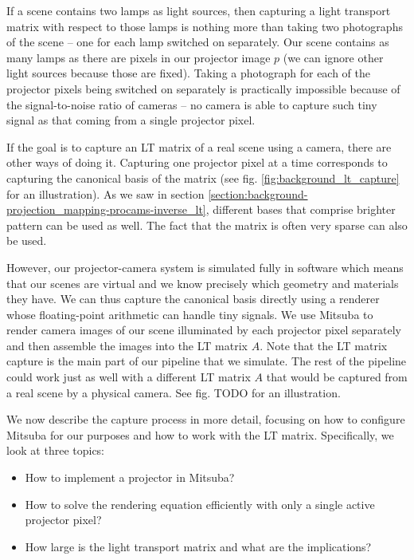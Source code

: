 If a scene contains two lamps as light sources, then capturing a light transport matrix with respect to those lamps is nothing more than taking two photographs of the scene -- one for each lamp switched on separately. Our scene contains as many lamps as there are pixels in our projector image \(p\) (we can ignore other light sources because those are fixed). Taking a photograph for each of the projector pixels being switched on separately is practically impossible because of the signal-to-noise ratio of cameras -- no camera is able to capture such tiny signal as that coming from a single projector pixel.

If the goal is to capture an LT matrix of a real scene using a camera, there are other ways of doing it. Capturing one projector pixel at a time corresponds to capturing the canonical basis of the matrix (see fig. \ref{fig:background_lt_capture} for an illustration). As we saw in section \ref{section:background-projection_mapping-procams-inverse_lt}, different bases that comprise brighter pattern can be used as well. The fact that the matrix is often very sparse can also be used.

However, our projector-camera system is simulated fully in software which means that our scenes are virtual and we know precisely which geometry and materials they have. We can thus capture the canonical basis directly using a renderer whose floating-point arithmetic can handle tiny signals. We use Mitsuba to render camera images of our scene illuminated by each projector pixel separately and then assemble the images into the LT matrix \(A\). Note that the LT matrix capture is the main part of our pipeline that we simulate. The rest of the pipeline could work just as well with a different LT matrix \(A\) that would be captured from a real scene by a physical camera. See fig. {\color{red} TODO} for an illustration.

We now describe the capture process in more detail, focusing on how to configure Mitsuba for our purposes and how to work with the LT matrix. Specifically, we look at three topics:

\begin{itemize}
    \item How to implement a projector in Mitsuba?
    \item How to solve the rendering equation efficiently with only a single active projector pixel?
    \item How large is the light transport matrix and what are the implications?
\end{itemize}

